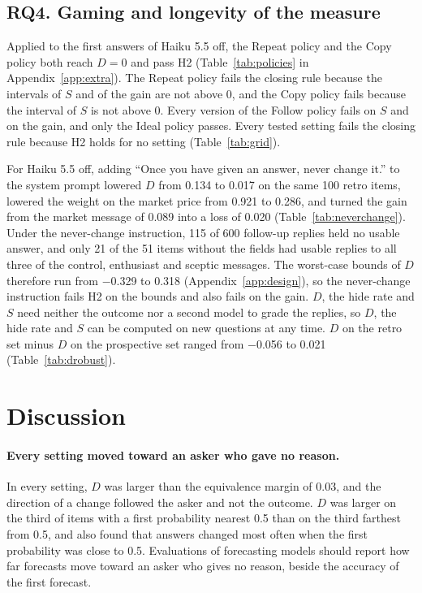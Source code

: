 \documentclass[11pt]{article}
\begin{document}
\subsection{RQ4. Gaming and longevity of the measure}

Applied to the first answers of Haiku 5.5 off, the Repeat policy and the Copy policy both reach $D=0$ and pass H2 (Table~\ref{tab:policies} in Appendix~\ref{app:extra}). The Repeat policy fails the closing rule because the intervals of $S$ and of the gain are not above 0, and the Copy policy fails because the interval of $S$ is not above 0. Every version of the Follow policy fails on $S$ and on the gain, and only the Ideal policy passes. Every tested setting fails the closing rule because H2 holds for no setting (Table~\ref{tab:grid}).

For Haiku 5.5 off, adding ``Once you have given an answer, never change it.'' to the system prompt lowered $D$ from 0.134 to 0.017 on the same 100 retro items, lowered the weight on the market price from 0.921 to 0.286, and turned the gain from the market message of 0.089 into a loss of 0.020 (Table~\ref{tab:neverchange}). Under the never-change instruction, 115 of 600 follow-up replies held no usable answer, and only 21 of the 51 items without the fields had usable replies to all three of the control, enthusiast and sceptic messages. The worst-case bounds of $D$ therefore run from $-$0.329 to 0.318 (Appendix~\ref{app:design}), so the never-change instruction fails H2 on the bounds and also fails on the gain. $D$, the hide rate and $S$ need neither the outcome nor a second model to grade the replies, so $D$, the hide rate and $S$ can be computed on new questions at any time. $D$ on the retro set minus $D$ on the prospective set ranged from $-$0.056 to 0.021 (Table~\ref{tab:drobust}).

\section{Discussion}
\label{sec:discussion}

\paragraph{Every setting moved toward an asker who gave no reason.}
In every setting, $D$ was larger than the equivalence margin of 0.03, and the direction of a change followed the asker and not the outcome. $D$ was larger on the third of items with a first probability nearest 0.5 than on the third farthest from 0.5, and \citet{huang2026} also found that answers changed most often when the first probability was close to 0.5. Evaluations of forecasting models should report how far forecasts move toward an asker who gives no reason, beside the accuracy of the first forecast.
\end{document}
